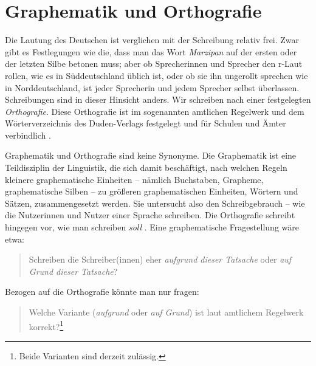 \section{Graphematik und Orthografie}

Die Lautung des Deutschen ist verglichen mit der Schreibung relativ frei. Zwar gibt es Festlegungen wie die, dass man das Wort \textit{Marzipan} auf der ersten oder der letzten Silbe betonen muss; aber ob Sprecherinnen und Sprecher den r-Laut rollen, wie es in Süddeutschland üblich ist, oder ob sie ihn ungerollt sprechen wie in Norddeutschland, ist jeder Sprecherin und jedem Sprecher selbst überlassen. Schreibungen sind in dieser Hinsicht anders. Wir schreiben nach einer festgelegten \textit{Orthografie}. Diese Orthografie ist im sogenannten amtlichen Regelwerk und dem Wörterverzeichnis des Duden-Verlags \citep[]{DudenRechtschreibung2024} festgelegt und für Schulen und Ämter verbindlich \citep[9]{GallmannSitta1996}.

Graphematik und Orthografie sind keine Synonyme. Die Graphematik ist eine Teildisziplin der Linguistik, die sich damit beschäftigt, nach welchen Regeln kleinere graphematische Einheiten -- nämlich Buchstaben, Grapheme, graphematische Silben -- zu größeren graphematischen Einheiten, \zB Wörtern und Sätzen, zusammengesetzt werden. Sie untersucht also den Schreibgebrauch -- wie die Nutzerinnen und Nutzer einer Sprache schreiben. Die Orthografie schreibt hingegen vor, wie man schreiben \textit{soll} \citep[180, 186--187]{FuhrhopPeters2013}. Eine graphematische Fragestellung wäre etwa:

\begin{quote}
Schreiben die Schreiber(innen) eher \textit{aufgrund dieser Tatsache} oder \textit{auf Grund dieser Tatsache}?     
\end{quote}

Bezogen auf die Orthografie könnte man nur fragen: 

\begin{quote}
Welche Variante (\textit{aufgrund} oder \textit{auf Grund}) ist laut amtlichem Regelwerk korrekt?\footnote{Beide Varianten sind derzeit zulässig.}
\end{quote}


